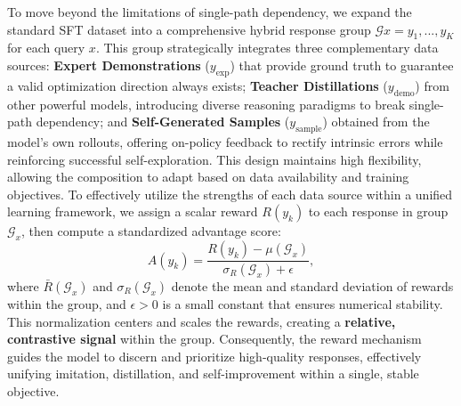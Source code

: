 To move beyond the limitations of single-path dependency, we expand the standard SFT dataset into a comprehensive hybrid response group $\mathcal{G}x = {y_1, ..., y_K}$ for each query $x$. This group strategically integrates three complementary data sources: \textbf{Expert Demonstrations} ($y_{\text{exp}}$) that provide ground truth to guarantee a valid optimization direction always exists; \textbf{Teacher Distillations} ($y_{\text{demo}}$) from other powerful models, introducing diverse reasoning paradigms to break single-path dependency; and \textbf{Self-Generated Samples} ($y_{\text{sample}}$) obtained from the model's own rollouts, offering on-policy feedback to rectify intrinsic errors while reinforcing successful self-exploration. This design maintains high flexibility, allowing the composition to adapt based on data availability and training objectives. To effectively utilize the strengths of each data source within a unified learning framework, we assign a scalar reward $R(y_k)$ to each response in group $\mathcal{G}_x$, then compute a standardized advantage score:
\begin{equation}
A(y_k) = \frac{R(y_k) - \mu(\mathcal{G}_x)}{\sigma_R(\mathcal{G}_x) + \epsilon},
\label{eq:advantage}
\end{equation}
where \(\bar{R}(\mathcal{G}_x)\) and \(\sigma_R(\mathcal{G}_x)\) denote the mean and standard deviation of rewards within the group, and \(\epsilon > 0\) is a small constant that ensures numerical stability. This normalization centers and scales the rewards, creating a \textbf{relative, contrastive signal} within the group. Consequently, the reward mechanism guides the model to discern and prioritize high-quality responses, effectively unifying imitation, distillation, and self-improvement within a single, stable objective.


